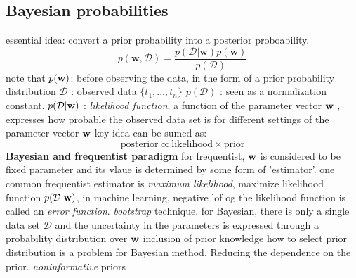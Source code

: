 \documentclass[a4paper]{book}
\begin{document}
\subsection{Bayesian probabilities}
essential idea: convert a prior probability into a posterior proboability.
\begin{equation}\label{eq1.1}
  p(\textbf{w},\mathcal{D}) = \frac{p(\mathcal{D}|\textbf {w})p(\textbf {w})}{p(\mathcal{D})}
\end{equation}
note that\newline
$p(\textbf w)$: before observing the data, in the form of a prior probability distribution\newline
$\mathcal{D}$ : observed data $\{t_1,\dots, t_n\}$\newline
$p(\mathcal{D})$ : seen as a normalization constant.\newline
$p(\mathcal{D}|\textbf w)$ : \emph{likelihood function}.  a function of the parameter vector $\textbf w$ , expresses how probable the observed data set is for different settings of the parameter vector $\textbf  w$
key idea can be sumed as:
\begin{equation}\label{eq1.2}
\mathrm{posterior} \propto \mathrm{likelihood} \times \mathrm{prior}
\end{equation}
\textbf{Bayesian and frequentist paradigm}
for frequentist, $\textbf  w$ is considered to be fixed parameter and its vlaue is determined by some form of 'estimator'.\newline
one common frequentist estimator is \emph{maximum likelihood},  maximize likelihood function $p(\mathcal{D}|\textbf w)$, in machine learning, negative lof og the likelihood function is called an \emph{error function}.\newline
\emph{bootstrap} technique.\newline
for Bayesian, there is only a single data set $\mathcal{D}$ and the uncertainty in the parameters is expressed through a probability distribution over $\textbf w$\newline
inclusion of prior knowledge\newline
how to select prior distribution is a problem for Bayesian method.\newline
Reducing the dependence on the prior. \emph{noninformative} priors
\end{document}
